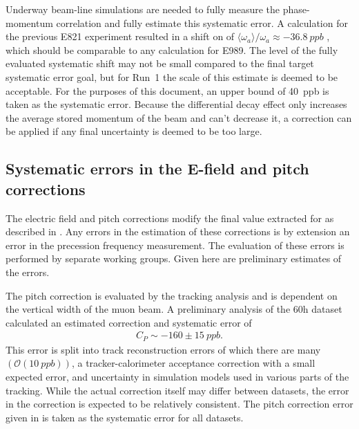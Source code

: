 Underway beam-line simulations are needed to fully measure the phase-momentum correlation and fully estimate this systematic error. A calculation for the previous E821 experiment resulted in a shift on \wa of $\langle \omega_{a} \rangle / \omega_{a} \approx \SI{-36.8}{ppb}$ \cite{DiffDecayJason}, which should be comparable to any calculation for E989. The level of the fully evaluated systematic shift may not be small compared to the final target systematic error goal, but for Run~1 the scale of this estimate is deemed to be acceptable. For the purposes of this document, an upper bound of \SI{40}{ppb} is taken as the systematic error. Because the differential decay effect only increases the average stored momentum of the beam and can't decrease it, a correction can be applied if any final uncertainty is deemed to be too large. 






\subsection{Systematic errors in the E-field and pitch corrections}
\label{sub:EfieldPitchErrors}


The electric field and pitch corrections modify the final value extracted for \wa as described in . Any errors in the estimation of these corrections is by extension an error in the precession frequency measurement. The evaluation of these errors is performed by separate working groups. Given here are preliminary estimates of the errors. 


The pitch correction is evaluated by the tracking analysis and is dependent on the vertical width of the muon beam. A preliminary analysis of the 60h dataset calculated an estimated correction and systematic error of \cite{PitchReview,PitchElba}
    \begin{align} \label{eq:pitchError}
        C_{P} \sim -160 \pm \SI{15}{ppb}.
    \end{align}
This error is split into track reconstruction errors of which there are many $(\mathcal{O}(\SI{10}{ppb}))$, a tracker-calorimeter acceptance correction with a small expected error, and uncertainty in simulation models used in various parts of the tracking. While the actual correction itself may differ between datasets, the error in the correction is expected to be relatively consistent. The pitch correction error given in  is taken as the systematic error for all datasets. 

